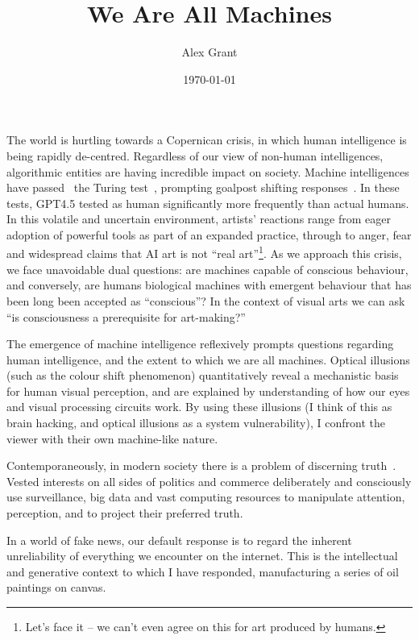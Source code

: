 \documentclass[12pt]{article}
\title{We Are All Machines}
\author{Alex Grant}
\date{\today}
\begin{document}
\onehalfspacing
\maketitle

The world is hurtling towards a Copernican crisis, in which human
intelligence is being rapidly de-centred. Regardless of our view of
non-human intelligences, algorithmic entities are having incredible
impact on society. Machine intelligences have
passed~\cite{jones2025largelanguagemodelspass} the Turing
test~\cite{turing1950}, prompting goalpost shifting
responses~\cite{feather2025brainmodelevaluationsneedneuroai}. In these
tests, GPT4.5 tested as human significantly more frequently than
actual humans. In this volatile and uncertain environment, artists'
reactions range from eager adoption of powerful tools as part of an
expanded practice, through to anger, fear and widespread claims that
AI art is not ``real art''\footnote{Let's face it -- we can't even
  agree on this for art produced by humans.}. As we approach this
crisis, we face unavoidable dual questions: are machines capable
of conscious behaviour, and conversely, are humans biological machines
with emergent behaviour that has been long been accepted as
``conscious''? In the context of visual arts we can ask ``is
consciousness a prerequisite for art-making?''

The emergence of machine intelligence reflexively prompts questions regarding human intelligence, and the extent to which we are all machines. Optical illusions (such as the colour shift phenomenon) quantitatively reveal a mechanistic basis for human visual perception, and are explained by understanding of how our eyes and visual processing circuits work. By using these illusions (I think of this as brain hacking, and optical illusions as a system vulnerability), I confront the viewer with their own machine-like nature.

 Contemporaneously, in modern society there is a problem of discerning truth~\cite{keyes2004posttruth,mcintyre2018posttruth}.  Vested interests on all sides of politics and commerce deliberately and consciously use surveillance, big data and vast computing resources  to manipulate attention, perception, and to project their preferred truth. 
 
 In a world of fake news, our default response is to regard the inherent unreliability of everything we encounter on the internet. This is the intellectual and generative context to which I have responded,  manufacturing a series of oil paintings on canvas. 
 
\end{document}
